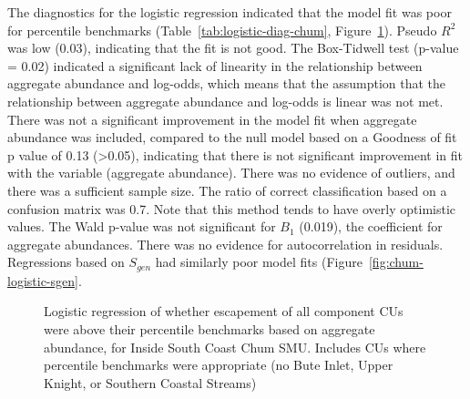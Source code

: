\documentclass[11pt]{book}
\begin{document}
The diagnostics for the logistic regression indicated that the model fit was poor for percentile benchmarks (Table~\ref{tab:logistic-diag-chum}, Figure~\ref{fig:chum-logistic-perc}). Pseudo \(R^2\) was low (0.03), indicating that the fit is not good. The Box-Tidwell test (p-value = 0.02) indicated a significant lack of linearity in the relationship between aggregate abundance and log-odds, which means that the assumption that the relationship between aggregate abundance and log-odds is linear was not met. There was not a significant improvement in the model fit when aggregate abundance was included, compared to the null model based on a Goodness of fit p value of 0.13 (\textgreater0.05), indicating that there is not significant improvement in fit with the variable (aggregate abundance). There was no evidence of outliers, and there was a sufficient sample size. The ratio of correct classification based on a confusion matrix was 0.7. Note that this method tends to have overly optimistic values. The Wald p-value was not significant for \(B_{1}\) (0.019), the coefficient for aggregate abundances. There was no evidence for autocorrelation in residuals. Regressions based on \(S_{gen}\) had similarly poor model fits (Figure~\ref{fig:chum-logistic-sgen}.
\begin{figure}[htb]

{\centering {} 

}

\caption{Logistic regression of whether escapement of all component CUs were above their percentile benchmarks based on aggregate abundance, for Inside South Coast Chum SMU. Includes CUs where percentile benchmarks were appropriate (no Bute Inlet, Upper Knight, or Southern Coastal Streams)}\label{fig:chum-logistic-perc}
\end{figure}
\end{document}

